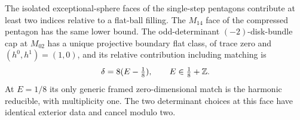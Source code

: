 \begin{lemma}\label{lem:ordinary:cap-shifts}
The isolated exceptional-sphere faces of the single-step pentagons
contribute at least two indices relative to a flat-ball filling.
The $M_{14}$ face of the compressed pentagon has the same lower
bound.  The odd-determinant $(-2)$-disk-bundle cap at $M_{02}$
has a unique projective boundary flat class, of trace zero and
$(h^0,h^1)=(1,0)$, and its relative contribution including matching is
\begin{equation}\label{eq:ordinary:minus-two-shift}
 \delta=8(E-\tfrac18),\qquad E\in\tfrac18+\mathbb Z.
\end{equation}
At $E=1/8$ its only generic framed zero-dimensional match is the
harmonic reducible, with multiplicity one.  The two determinant
choices at this face have identical exterior data and cancel
modulo two.
\end{lemma}
